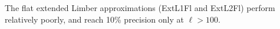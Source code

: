 \documentclass[useAMS,usenatbib]{mn2e} %
\begin{document}
The flat extended Limber approximations (ExtL1Fl and ExtL2Fl) perform relatively poorly, and
reach 10\% precision only at $\ell > 100$.

\begin{figure}

  \begin{center}
  \end{center}


\end{figure}
\end{document}
